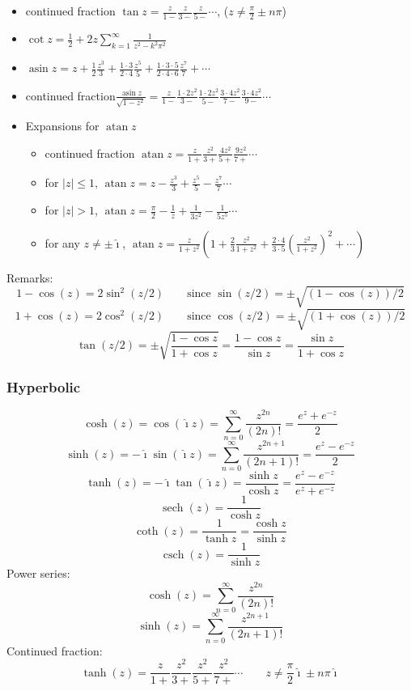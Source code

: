 \documentclass[10pt,dvipdfmx,letterpaper,twoside]{article}
\DeclareMathOperator{\asin}{asin}
\DeclareMathOperator{\atan}{atan}
\let\O=\operatorname
\newcommand{\ii}{{\hat{\imath}}}
\newenvironment{implementation}{\noindent\begin{framed}}{\end{framed}}
\begin{document}
\begin{implementation}
\begin{itemize}
\item continued fraction $\tan z = \frac{z}{1-} \frac{z}{3-} \frac{z}{5-} \cdots$, ($z\neq\frac\pi2\pm n\pi$)
\item $\cot z = \frac12 + 2z\sum_{k=1}^\infty\frac{1}{z^2 - k^2\pi^2}$
\item $\asin z = z + \frac{1}{2}\frac{z^3}{3} + \frac{1\cdot3}{2\cdot4}\frac{z^5}{5} + \frac{1\cdot3\cdot5}{2\cdot4\cdot6}\frac{z^7}{7} + \cdots$
\item continued fraction$\frac{\asin z}{\sqrt{1 - z^2}} = \frac{z}{1 - } \frac{1\cdot2 z^2}{3-} \frac{1\cdot2 z^2}{5-} \frac{3\cdot4 z^2}{7-} \frac{3\cdot4 z^2}{9-} \cdots$
\item Expansions for $\atan z$
  \begin{itemize}
  \item continued fraction $\atan z = \frac{z}{1+} \frac{z^2}{3+} \frac{4z^2}{5+} \frac{9z^2}{7+} \cdots$
  \item for $|z|\leq 1$, $\atan z = z - \frac{z^3}{3} + \frac{z^5}{5} - \frac{z^7}{7} \cdots$
  \item for $|z|> 1$, $\atan z = \frac{\pi}{2} - \frac{1}{z} + \frac{1}{3z^2} - \frac{1}{5z^5} \cdots$
  \item for any $z\neq\pm\ii$, $\atan z = \frac{z}{1+z^2}\left(1 + \frac{2}{3}\frac{z^2}{1+z^2} + \frac{2\cdot4}{3\cdot5}(\frac{z^2}{1+z^2})^2+\cdots\right)$
  \end{itemize}
\end{itemize}
\end{implementation}

Remarks:
\[ 1-\cos(z)=2\sin^2(z/2) \qquad\text{since $\sin(z/2)=\pm\sqrt{(1-\cos(z))/2}$} \]
\[ 1+\cos(z)=2\cos^2(z/2) \qquad\text{since $\cos(z/2)=\pm\sqrt{(1+\cos(z))/2}$} \]
\[ \tan(z/2) = \pm\sqrt{\frac{1-\cos z}{1+\cos z}} = \frac{1-\cos z}{\sin z} = \frac{\sin z}{1+\cos z} \]

\subsubsection{Hyperbolic}
\[ \cosh(z) = \cos(\ii z) = \sum_{n=0}^\infty \frac{z^{2n}}{(2n)!} = \frac{e^{z} + e^{-z}}{2} \]
\[ \sinh(z) = -\ii\sin(\ii z) = \sum_{n=0}^\infty \frac{z^{2n+1}}{(2n+1)!} = \frac{e^{z} - e^{-z}}{2} \]
\[ \tanh(z) = -\ii\tan(\ii z) = \frac{\sinh z}{\cosh z} = \frac{e^{z} - e^{-z}}{e^{z} + e^{-z}} \]
\[ \O{sech}(z) = \frac{1}{\cosh z} \]
\[ \O{coth}(z) = \frac{1}{\tanh z} = \frac{\cosh z}{\sinh z} \]
\[ \O{csch}(z) = \frac{1}{\sinh z} \]
Power series:
\[ \cosh(z) = \sum_{n=0}^\infty\frac{z^{2n}}{(2n)!} \]
\[ \sinh(z) = \sum_{n=0}^\infty\frac{z^{2n+1}}{(2n+1)!} \]
Continued fraction:
\[ \tanh(z) = \frac{z}{1+} \frac{z^2}{3+} \frac{z^2}{5+} \frac{z^2}{7+} \cdots \qquad z\neq\frac\pi2\ii\pm n\pi\ii \]
\end{document}
